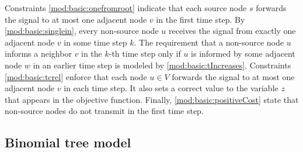 Constraints \eqref{mod:basic:onefromroot} indicate that each source node $s$ forwards the signal to at most one adjacent node $v$ in the first time step. 
By \eqref{mod:basic:singlein}, every non-source node $u$ receives the signal from exactly one adjacent node $v$ in some time step $k$.
The requirement that a non-source node $u$ informs a neighbor $v$ in the $k$-th time step only if $u$ is informed by some adjacent node $w$ in an earlier time step is modeled by \eqref{mod:basic:tIncreases}. 
Constraints \eqref{mod:basic:tcrel} enforce that each node $u\in V$ forwards the signal to at most one adjacent node $v$ in each time step.
It also sets a correct value to the variable $z$ that appears in the objective function.
Finally, \eqref{mod:basic:positiveCost} state that non-source nodes do not transmit in the first time step.
\subsection{Binomial tree model}

